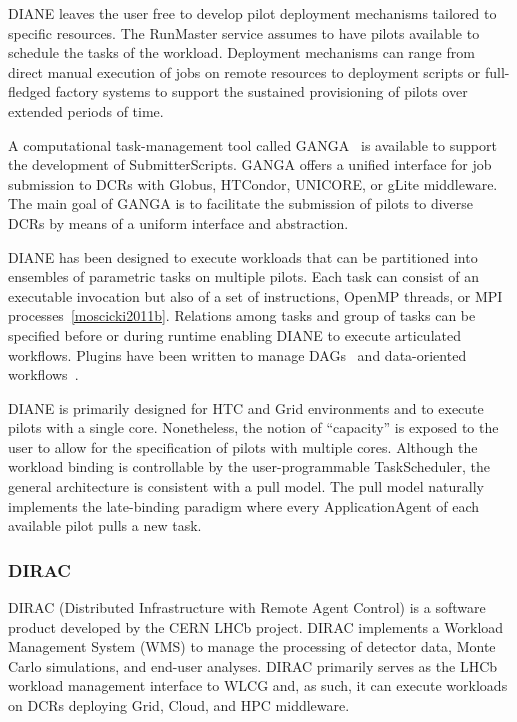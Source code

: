\documentclass{sig-alternate}
\begin{document}
DIANE leaves the user free to develop pilot deployment mechanisms tailored to
specific resources. The RunMaster service assumes to have pilots available to
schedule the tasks of the workload. Deployment mechanisms can range from direct
manual execution of jobs on remote resources to deployment scripts or
full-fledged factory systems to support the sustained provisioning of pilots
over extended periods of time.

A computational task-management tool called
GANGA~\cite{moscicki2009ganga,ganga_url} is available to support the development
of SubmitterScripts. GANGA offers a unified interface for job submission to DCRs
with Globus, HTCondor, UNICORE, or gLite middleware. The main goal of GANGA is
to facilitate the submission of pilots to diverse DCRs by means of a uniform
interface and abstraction.

DIANE has been designed to execute workloads that can be partitioned into
ensembles of parametric tasks on multiple pilots. Each task can consist of an
executable invocation but also of a set of instructions, OpenMP threads, or MPI
processes~\ref{moscicki2011b}. Relations among tasks and group of tasks can be
specified before or during runtime enabling DIANE to execute articulated
workflows. Plugins have been written to manage DAGs~\cite{grzeslo2009} and
data-oriented workflows~\cite{glatard2008}.

DIANE is primarily designed for HTC and Grid environments and to execute pilots
with a single core. Nonetheless, the notion of ``capacity'' is exposed to the
user to allow for the specification of pilots with multiple cores. Although the
workload binding is controllable by the user-programmable TaskScheduler, the
general architecture is consistent with a pull model. The pull model naturally
implements the late-binding paradigm where every ApplicationAgent of each
available pilot pulls a new task.

%
\subsubsection{DIRAC}\label{sec:dirac}

DIRAC (Distributed Infrastructure with Remote Agent Control) is a software
product developed by the CERN LHCb project\cite{tsaregorodtsev2004dirac}. DIRAC
implements a Workload Management System (WMS) to manage the processing of
detector data, Monte Carlo simulations, and end-user analyses. DIRAC primarily
serves as the LHCb workload management interface to WLCG and, as such, it can
execute workloads on DCRs deploying Grid, Cloud, and HPC middleware.
\end{document}
